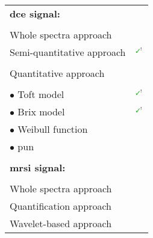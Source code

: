 \begin{table}
\begin{tabular}{l r}
  \textbf{\acs*{dce} signal:} & \\ \\ [-1.5ex]
  \quad Whole spectra approach & \cite{Ampeliotis2007,Ampeliotis2008,Lemaitre2016thesis} \\
  \quad Semi-quantitative approach & $^{\text{{\mmarksmall}}}$\cite{Puech2009} \cite{Mazzetti2011,Niaf2011,Niaf2012,Sung2011,trigui2016classification,trigui2017automatic,lehaire2014computer,samarasinghe2016semi,giannini2015fully,Lemaitre2016thesis} \\ \\ [-1.5ex]
  \quad Quantitative approach &  \\ \\ [-1.5ex]
  \quad \quad $\bullet$ Toft model & $^{\text{{\mmarksmall}}}$\cite{Liu2013,Peng2013} \cite{Giannini2013,Langer2009,Litjens2011,Litjens2012,Litjens2014,Mazzetti2011,Niaf2011,Niaf2012,lehaire2014computer,giannini2015fully,Lemaitre2016thesis} \\
  \quad \quad $\bullet$ Brix model & $^{\text{{\mmarksmall}}}$\cite{Artan2009,Artan2010,Ozer2009,Ozer2010} \cite{Liu2009,Sung2011,Lemaitre2016thesis} \\
  \quad \quad $\bullet$ Weibull function & \cite{Giannini2013,Mazzetti2011,giannini2015fully,Lemaitre2016thesis} \\
  \quad \quad $\bullet$ \acs*{pun} & \cite{Giannini2013,Mazzetti2011,giannini2015fully,Lemaitre2016thesis} \\ \\ [-1.5ex]
  \textbf{\acs*{mrsi} signal:} & \\ \\ [-1.5ex]
  \quad Whole spectra approach & \cite{Kelm2007,Matulewicz2013,Parfait2012,Tiwari2007,Tiwari2008,Tiwari2009,Tiwari2009a,Tiwari2010,Tiwari2013,Viswanath2008,Lemaitre2016thesis} \\
  \quad Quantification approach & \cite{Kelm2007,Parfait2012,trigui2016classification,trigui2017automatic,Lemaitre2016thesis} \\
  \quad Wavelet-based approach & \cite{Tiwari2012} \\
    \bottomrule
    \end{tabular}
  \label{tab:feat}
\end{table}

